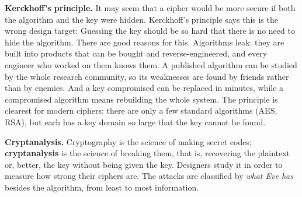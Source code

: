 \textbf{Kerckhoff's principle.} It may seem that a cipher would be more secure if both the algorithm and the key were hidden. Kerckhoff's principle says this is the wrong design target:  Guessing the key should be so hard that there is no need to hide the algorithm. There are good reasons for this. Algorithms leak: they are built into products that can be bought and reverse-engineered, and every engineer who worked on them knows them. A published algorithm can be studied by the whole research community, so its weaknesses are found by friends rather than by enemies. And a key compromised can be replaced in minutes, while a compromised algorithm means rebuilding the whole system. The principle is clearest for modern ciphers: there are only a few standard algorithms (AES, RSA), but each has a key domain so large that the key cannot be found.

\textbf{Cryptanalysis.} Cryptography is the science of making secret codes; \textbf{cryptanalysis} is the science of breaking them, that is, recovering the plaintext or, better, the key without being given the key. Designers study it in order to measure how strong their ciphers are. The attacks are classified by \emph{what Eve has} besides the algorithm, from least to most information.
\begin{center}
\end{center}

